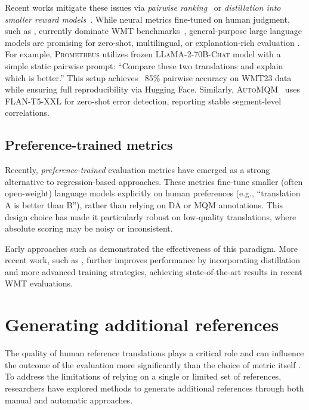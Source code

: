Recent works mitigate these issues via \textit{pairwise ranking}~\citep{kocmi-etal-2024-navigating} or \textit{distillation into smaller reward models}~\citep{tan-monz-2025-remedy}. While neural metrics fine-tuned on human judgment, such as \comet, currently dominate WMT benchmarks~\citep{freitag-etal-2024-llms}, general-purpose large language models are promising for zero-shot, multilingual, or explanation-rich evaluation \citep{kocmi-federmann-2023-gemba, fernandes-etal-2023-devil, leiter-etal-2023-eval4nlp, xu-etal-2023-instructscore, leiter-eger-2024-prexme}. For example, \textsc{Prometheus} \citep{kim-etal-2024-prometheus} utilizes frozen \textsc{LLaMA-2-70B-Chat} model with a simple static pairwise prompt: ``Compare these two translations and explain which is better.'' This setup achieves ~85\% pairwise accuracy on WMT23 data while ensuring full reproducibility via Hugging Face. Similarly, \textsc{AutoMQM}~\citep{fernandes-etal-2023-devil} uses \textsc{FLAN-T5-XXL} for zero-shot error detection, reporting stable segment-level correlations.

\subsection{Preference-trained metrics}
Recently, \textit{preference-trained} evaluation metrics have emerged as a strong alternative to regression-based approaches. These metrics fine-tune smaller (often open-weight) language models explicitly on human preferences (e.g., ``translation A is better than B''), rather than relying on DA or MQM annotations. This design choice has made it particularly robust on low-quality translations, where absolute scoring may be noisy or inconsistent.

Early approaches such as \mtranker \citep{Moosa2024MTRankerRM} demonstrated the effectiveness of this paradigm. More recent work, such as \remedy \citep{tan-monz-2025-remedy}, further improves performance by incorporating distillation and more advanced training strategies, achieving state-of-the-art results in recent WMT evaluations.


\section{Generating additional references}

The quality of human reference translations plays a critical role and can influence the outcome of the evaluation more significantly than the choice of metric itself \citep{freitag-etal-2020-bleu}. To address the limitations of relying on a single or limited set of references, researchers have explored methods to generate additional references through both manual and automatic approaches.

